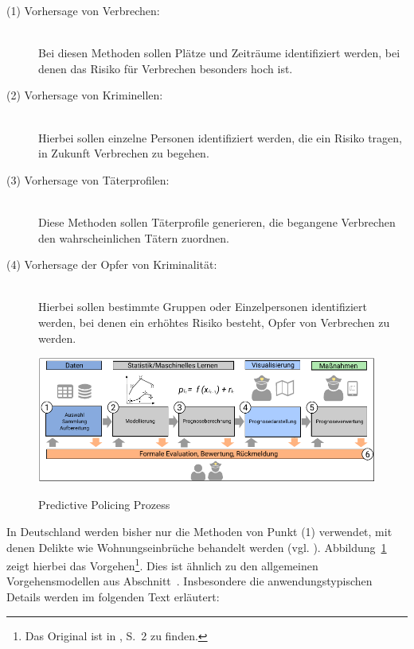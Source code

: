 \begin{description}

\item[(1) Vorhersage von Verbrechen:] \hfill \\
Bei diesen Methoden sollen Plätze und Zeiträume identifiziert werden,
bei denen das Risiko für Verbrechen besonders hoch ist.

\item[(2) Vorhersage von Kriminellen:] \hfill \\
Hierbei sollen einzelne Personen identifiziert werden, die ein Risiko
tragen, in Zukunft Verbrechen zu begehen.

\item[(3) Vorhersage von Täterprofilen:] \hfill \\
Diese Methoden sollen Täterprofile generieren, die begangene Verbrechen
den wahrscheinlichen Tätern zuordnen.

\item[(4) Vorhersage der Opfer von Kriminalität:] \hfill \\
Hierbei sollen bestimmte Gruppen oder Einzelpersonen identifiziert werden,
bei denen ein erhöhtes Risiko besteht, Opfer von Verbrechen zu werden.

\end{description} 

\begin{figure}%
\centering
\caption{Predictive Policing Prozess}
\includegraphics[scale=1.1]{Grafiken/Predictive_Policing_Ink.pdf} 
\label{pic:Predictive_Policing}
\end{figure}

In Deutschland werden bisher nur die Methoden von Punkt (1) verwendet, mit denen
Delikte wie Wohnungseinbrüche behandelt werden (vgl. \cite{Heuberger}).
Abbildung~\ref{pic:Predictive_Policing} zeigt hierbei das Vorgehen\footnote{
Das Original ist in \cite{Bode}, S.~2 zu finden.
}. Dies ist ähnlich zu den
allgemeinen Vorgehensmodellen aus Abschnitt~\xcom. Insbesondere die anwendungstypischen Details werden
im folgenden Text erläutert:

